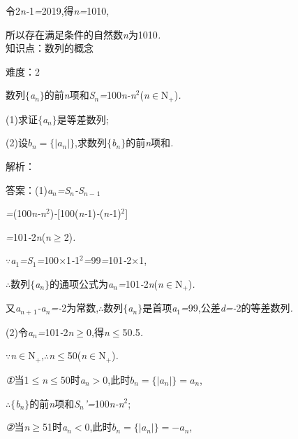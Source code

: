 \documentclass{article} %
\begin{document}
令2\textit{n-}1\textit{=}2019,得\textit{n=}1010,

所以存在满足条件的自然数\textit{n}为1010\textit{.} \\

知识点：数列的概念

难度：2

 数列$\mathrm{\{}$\textit{a${}_{n}$}$\mathrm{\}}$的前\textit{n}项和\textit{S${}_{n}$=}100\textit{n-n}${}^{2}$(\textit{n}$\mathrm{\in}$N\textit{${}_{+}$})\textit{.}

 (1)求证$\mathrm{\{}$\textit{a${}_{n}$}$\mathrm{\}}$是等差数列;

 (2)设$b_n=\{|a_n|\}$,求数列$\mathrm{\{}$\textit{b${}_{n}$}$\mathrm{\}}$的前\textit{n}项和\textit{.}

解析：

 答案：(1)\textit{a${}_{n}$=S${}_{n}$-S${}_{n-}$}${}_{1}$

\textit{=}(100\textit{n-n}${}^{2}$)\textit{-}[100(\textit{n-}1)\textit{-}(\textit{n-}1)${}^{2}$]

\textit{=}101\textit{-}2\textit{n}(\textit{n}$\mathrm{\ge}$2)\textit{.}

\textit{$\because$a}${}_{1}$\textit{=S}${}_{1}$\textit{=}100\textit{$\times$}1\textit{-}1${}^{2}$\textit{=}99\textit{=}101\textit{-}2\textit{$\times$}1,

\textit{$\therefore$}数列$\mathrm{\{}$\textit{a${}_{n}$}$\mathrm{\}}$的通项公式为\textit{a${}_{n}$=}101\textit{-}2\textit{n}(\textit{n}$\mathrm{\in}$N\textit{${}_{+}$})\textit{.}

又\textit{a${}_{n+}$}${}_{1}$\textit{-a${}_{n}$=-}2为常数,\textit{$\therefore$}数列$\mathrm{\{}$\textit{a${}_{n}$}$\mathrm{\}}$是首项\textit{a}${}_{1}$\textit{=}99,公差\textit{d=-}2的等差数列\textit{.}

 (2)令\textit{a${}_{n}$=}101\textit{-}2\textit{n}$\mathrm{\ge}$0,得\textit{n}$\mathrm{\le}$50\textit{.}5\textit{.}

\textit{$\because$n}$\mathrm{\in}$N\textit{${}_{+}$},\textit{$\therefore$n}$\mathrm{\le}$50(\textit{n}$\mathrm{\in}$N\textit{${}_{+}$})\textit{.}

\textit{①}当1$\mathrm{\le}$\textit{n}$\mathrm{\le}$50时\textit{a${}_{n}$$>$}0,此时$b_n=\{|a_n|\}=a_n$,

\textit{$\therefore$}$\mathrm{\{}$\textit{b${}_{n}$}$\mathrm{\}}$的前\textit{n}项和\textit{S${}_{n}$'=}100\textit{n-n}${}^{2}$;

\textit{②}当\textit{n}$\mathrm{\ge}$51时\textit{a${}_{n}$$<$}0,此时$b_n=\{|a_n|\}=-a_n$,
\end{document}
